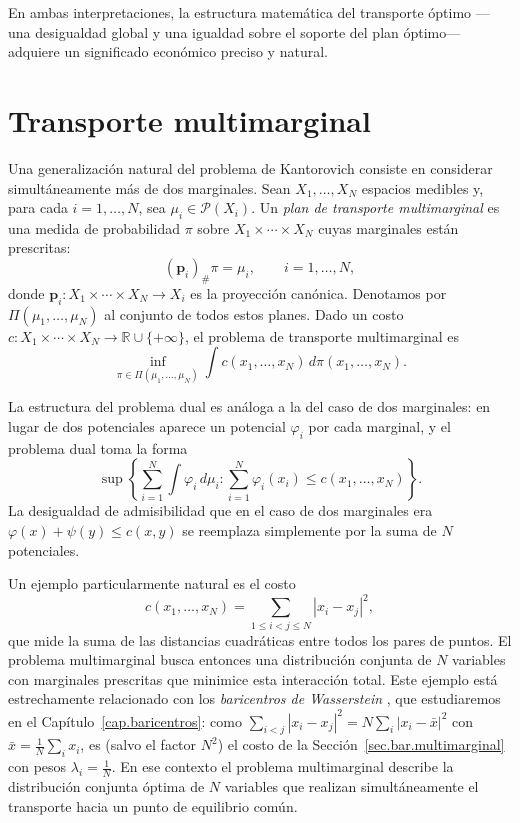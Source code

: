 \documentclass[12pt, a4paper]{amsbook}
\theoremstyle{remark}
\theoremstyle{definition}
\numberwithin{section}{chapter}
\numberwithin{subsection}{section}
\numberwithin{equation}{section}
\numberwithin{figure}{chapter}
\begin{document}
En ambas interpretaciones, la estructura matemática del transporte óptimo
—una desigualdad global y una igualdad sobre el soporte del plan óptimo—
adquiere un significado económico preciso y natural.

\section{Transporte multimarginal}\label{sec.multimarginal}

Una generalización natural del problema de Kantorovich consiste en considerar
simultáneamente más de dos marginales. Sean $X_1,\ldots,X_N$ espacios
medibles y, para cada $i=1,\ldots,N$, sea $\mu_i\in\mathcal{P}(X_i)$.
Un \emph{plan de transporte multimarginal} es una medida de probabilidad
$\pi$ sobre $X_1\times\cdots\times X_N$ cuyas marginales están prescritas:
\[
(\mathbf{p}_i)_\#\pi=\mu_i,\qquad i=1,\ldots,N,
\]
donde $\mathbf{p}_i\colon X_1\times\cdots\times X_N\to X_i$ es la proyección
canónica. Denotamos por $\Pi(\mu_1,\ldots,\mu_N)$ al conjunto de todos estos
planes. Dado un costo $c\colon X_1\times\cdots\times X_N\to\mathbb{R}\cup\{+\infty\}$,
el problema de transporte multimarginal es
\[
\inf_{\pi\in\Pi(\mu_1,\ldots,\mu_N)}
\int c(x_1,\ldots,x_N)\,d\pi(x_1,\ldots,x_N).
\]

La estructura del problema dual es análoga a la del caso de dos marginales:
en lugar de dos potenciales aparece un potencial $\varphi_i$ por cada
marginal, y el problema dual toma la forma
\[
\sup\left\{
\sum_{i=1}^N\int\varphi_i\,d\mu_i
:
\sum_{i=1}^N\varphi_i(x_i)\le c(x_1,\ldots,x_N)
\right\}.
\]
La desigualdad de admisibilidad que en el caso de dos marginales era
$\varphi(x)+\psi(y)\le c(x,y)$ se reemplaza simplemente por la suma de $N$
potenciales.

Un ejemplo particularmente natural es el costo
\[
c(x_1,\ldots,x_N)=\sum_{1\le i<j\le N}|x_i-x_j|^2,
\]
que mide la suma de las distancias cuadráticas entre todos los pares de
puntos. El problema multimarginal busca entonces una distribución conjunta de
$N$ variables con marginales prescritas que minimice esta interacción total.
Este ejemplo está estrechamente relacionado con los \emph{baricentros de
Wasserstein} \cite{Santambrogio}, que estudiaremos en el
Capítulo~\ref{cap.baricentros}: como
$\sum_{i<j}|x_i-x_j|^2=N\sum_i|x_i-\bar x|^2$ con
$\bar x=\frac1N\sum_ix_i$, es (salvo el factor $N^2$) el costo de la
Sección~\ref{sec.bar.multimarginal} con pesos $\lambda_i=\frac1N$. En ese
contexto el problema multimarginal describe la distribución conjunta óptima
de $N$ variables que realizan simultáneamente el transporte hacia un punto
de equilibrio común.
\end{document}
